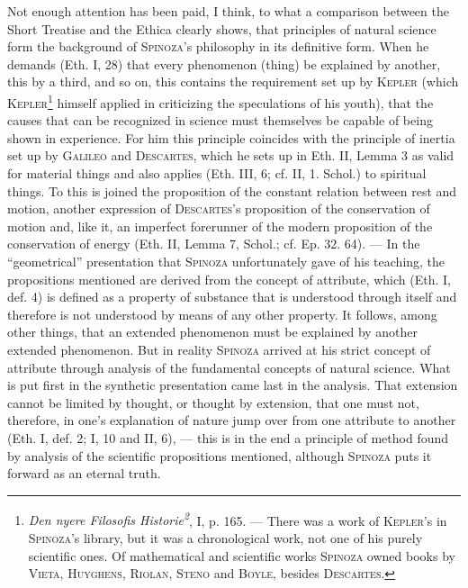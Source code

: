 \documentclass[12pt]{article}
\newcommand{\opage}[1]{\marginnote{\footnotesize\textit{[#1]}}}
\begin{document}
Not enough attention has been paid, I think, to what a comparison between the
Short Treatise and the Ethica clearly shows, that principles of natural science
form the background of \textsc{Spinoza}'s philosophy in its definitive form.
When he demands (Eth. I, 28) that every phenomenon (thing) be explained by another,
this by a third, and so on, this contains the requirement set up by
\textsc{Kepler} (which \textsc{Kepler}\footnote{\textit{Den nyere Filosofis
Historie\textsuperscript{2}}, I, p. 165. --- There was a work of \textsc{Kepler}'s
in \textsc{Spinoza}'s library, but it was a chronological work, not one of his
purely scientific ones. Of mathematical and scientific works \textsc{Spinoza} owned
books by \textsc{Vieta}, \textsc{Huyghens}, \textsc{Riolan}, \textsc{Steno} and
\textsc{Boyle}, besides \textsc{Descartes}.} himself applied in criticizing the
speculations of his youth), that the causes that can be recognized in science must
themselves be capable of being shown in \opage{10}experience. For him this
principle coincides with the principle of inertia set up by \textsc{Galileo} and
\textsc{Descartes}, which he sets up in Eth. II, Lemma 3 as valid for material
things and also applies (Eth. III, 6; cf. II, 1. Schol.) to spiritual things. To
this is joined the proposition of the constant relation between rest and motion,
another expression of \textsc{Descartes}'s proposition of the conservation of
motion and, like it, an imperfect forerunner of the modern proposition of the
conservation of energy (Eth. II, Lemma 7, Schol.; cf. Ep. 32. 64). --- In the
``geometrical'' presentation that \textsc{Spinoza} unfortunately gave of his
teaching, the propositions mentioned are derived from the concept of attribute,
which (Eth. I, def. 4) is defined as a property of substance that is understood
through itself and therefore is not understood by means of any other property. It
follows, among other things, that an extended phenomenon must be explained by
another extended phenomenon. But in reality \textsc{Spinoza} arrived at his strict
concept of attribute through analysis of the fundamental concepts of natural
science. What is put first in the synthetic presentation came last in the
analysis. That extension cannot be limited by thought, or thought by extension,
that one must not, therefore, in one's explanation of nature jump over from one
attribute to another (Eth. I, def. 2; I, 10 and II, 6), --- this is in the end a
principle of method found by analysis of the scientific propositions mentioned,
although \textsc{Spinoza} puts it forward as an eternal truth.
\end{document}
